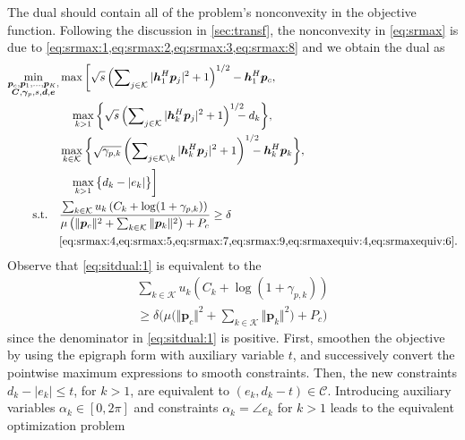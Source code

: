 \documentclass[a4paper,10pt,journal]{IEEEtran}
\let\vec\bm
\begin{document}
The  dual should contain all of the problem's nonconvexity in the objective function. Following the discussion in \cref{sec:transf}, the nonconvexity in \cref{eq:srmax} is due to \cref{eq:srmax:1,eq:srmax:2,eq:srmax:3,eq:srmax:8} and we obtain the  dual as
\begin{subequations} \label{eq:sitdual}
	\begin{align}
		\min_{\substack{\vec p_c, \vec p_1, \dots, \vec p_K,\\ \vec C, \vec \gamma_p, s, \vec d, \vec e}} & \max\bigg[
			\sqrt s \left( \sum\nolimits_{j\in\mathcal{K}}|\vec{h}_{1}^{H}\vec{p}_{j}|^2+1 \right)^{1/2} - {\vec{h}}_{1}^{H}\vec{p}_{c}, \notag\\
			&\quad \max_{k > 1} \bigg\{\sqrt s \left( \sum\nolimits_{j\in\mathcal{K}}|\vec{h}_{k}^{H}\vec{p}_{j}|^2+1 \right)^{1/2}\!\!\!\!\! - d_k \bigg\}, \notag\\
			&\max_{k\in\mathcal K} \bigg\{ \sqrt{\gamma_{p,k}} \left( \sum\nolimits_{j\in\mathcal{K}\setminus k}|\vec{h}_{k}^{H}\vec{p}_{j}|^2+1 \right)^{1/2}\!\!\!\!\! - {\vec{h}}_{k}^{H}\vec{p}_{k} \bigg\}, \notag\\
			&\quad\max_{k > 1} \big\{d_k - |e_k| \big\} \bigg]\label{eq:sitdual:0}\\
	\mbox{s.t.}\quad
	&   \frac{\sum_{k\in\mathcal{K}} u_k \left(C_k+\log(1+ \gamma_{p,k})\right)}{\mu \left( \Vert \vec p_c \Vert^2 + \sum_{k\in\mathcal K} \Vert \vec p_k \Vert^2 \right) + P_c}\ge \delta  \label{eq:sitdual:1} \\
	& \text{\cref{eq:srmax:4,eq:srmax:5,eq:srmax:7,eq:srmax:9,eq:srmaxequiv:4,eq:srmaxequiv:6}}. \label{eq:sitdual:2}
	\end{align}
\end{subequations}
Observe that \cref{eq:sitdual:1} is equivalent to the 
\begin{multline} \label{eq:sitdual:soc}
	\sum_{k\in\mathcal{K}} u_k \left(C_k+\log(1+ \gamma_{p,k})\right) \\\ge \delta \bigg( \mu \bigg( \Vert \vec p_c \Vert^2 + \sum_{k\in\mathcal K} \Vert \vec p_k \Vert^2 \bigg) + P_c \bigg)
\end{multline}
since the denominator in \cref{eq:sitdual:1} is positive. First, smoothen the objective by using the epigraph form with auxiliary variable $t$, and successively convert the pointwise maximum expressions to smooth constraints. Then, the new constraints $d_k - |e_k| \le t$, for $k > 1$, are equivalent to $(e_k, d_k - t)\in\mathcal C$. Introducing auxiliary variables $\alpha_k \in[0, 2\pi]$ and constraints $\alpha_k = \angle e_k$ for $k > 1$ leads to the equivalent optimization problem
\end{document}
